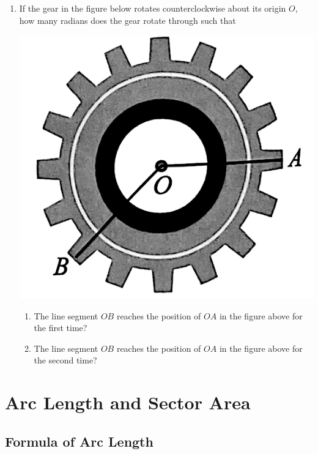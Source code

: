 \documentclass{report}
\begin{document}
\begin{enumerate}
    \item If the gear in the figure below rotates counterclockwise about its origin $O$, how many radians does the gear rotate through such that
    \begin{center}
        \includegraphics[scale=0.2]{assets/8-5.png}
    \end{center}
    \begin{enumerate}
        \item The line segment $OB$ reaches the position of $OA$ in the figure above for the first time?
        \item The line segment $OB$ reaches the position of $OA$ in the figure above for the second time?
    \end{enumerate}
\end{enumerate}

\newpage
\section{Arc Length and Sector Area}

\subsection*{Formula of Arc Length}
\end{document}
